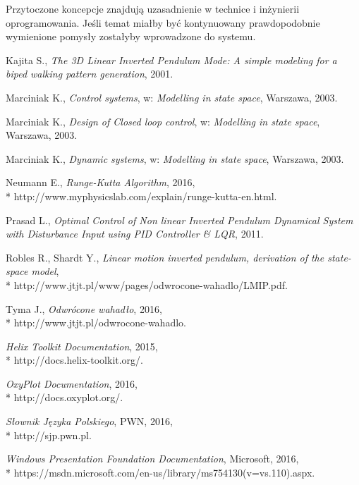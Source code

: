\documentclass[12pt, oneside]{report}
\theoremstyle{definition}
\begin{document}
Przytoczone koncepcje znajdują uzasadnienie w technice i inżynierii oprogramowania. Jeśli temat miałby być kontynuowany prawdopodobnie wymienione pomysły zostałyby wprowadzone do systemu.
	
\pagestyle{plain}
\begin{thebibliography}{11}

Kajita S., 
\emph{The 3D Linear Inverted Pendulum Mode: A simple modeling for a biped walking pattern generation}, 
2001.

Marciniak K., 
\emph{Control systems}, 
w: \emph{Modelling in state space}, 
Warszawa, 2003.

Marciniak K., 
\emph{Design of Closed loop control}, 
w: \emph{Modelling in state space}, 
Warszawa, 2003.

Marciniak K., 
\emph{Dynamic systems}, 
w: \emph{Modelling in state space}, 
Warszawa, 2003.

Neumann E., 
\emph{Runge-Kutta Algorithm}, 
2016,
\\*
http://www.myphysicslab.com/explain/runge-kutta-en.html.

Prasad L., 
\emph{Optimal Control of Non linear Inverted Pendulum Dynamical System with Disturbance Input using PID Controller \& LQR}, 
2011.

Robles R., Shardt Y., 
\emph{Linear motion inverted pendulum, derivation of the state-space model},
\\*
http://www.jtjt.pl/www/pages/odwrocone-wahadlo/LMIP.pdf.

 Tyma J., 
\emph{Odwrócone wahadło},
2016,
\\*
http://www.jtjt.pl/odwrocone-wahadlo.

\emph{Helix Toolkit Documentation}, 
2015,
\\*
http://docs.helix-toolkit.org/.

\emph{OxyPlot Documentation}, 
2016,
\\*
http://docs.oxyplot.org/.

\emph{Słownik Języka Polskiego}, 
PWN, 2016,
\\*
http://sjp.pwn.pl.

\emph{Windows Presentation Foundation Documentation}, 
Microsoft, 2016,
\\*
https://msdn.microsoft.com/en-us/library/ms754130(v=vs.110).aspx.


\end{thebibliography}
\end{document}
